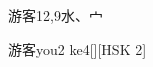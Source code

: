 \begin{entry}{游客}{12,9}{⽔、⼧}
  \begin{phonetics}{游客}{you2 ke4}[][HSK 2]
  \end{phonetics}
\end{entry}
